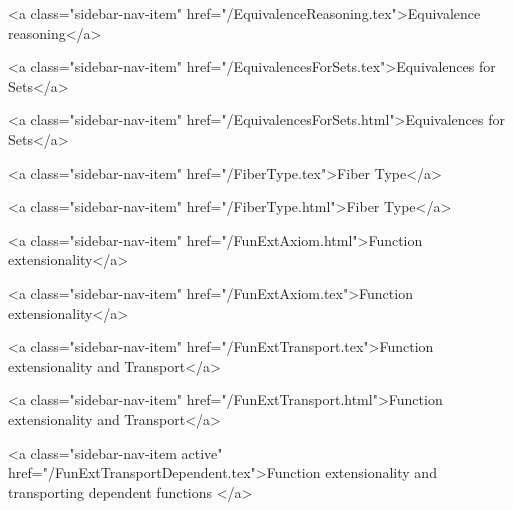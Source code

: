       
        
          <a class="sidebar-nav-item" href="/EquivalenceReasoning.tex">Equivalence reasoning</a>
        
      
    
      
        
          <a class="sidebar-nav-item" href="/EquivalencesForSets.tex">Equivalences for Sets</a>
        
      
    
      
        
          <a class="sidebar-nav-item" href="/EquivalencesForSets.html">Equivalences for Sets</a>
        
      
    
      
        
          <a class="sidebar-nav-item" href="/FiberType.tex">Fiber Type</a>
        
      
    
      
        
          <a class="sidebar-nav-item" href="/FiberType.html">Fiber Type</a>
        
      
    
      
        
          <a class="sidebar-nav-item" href="/FunExtAxiom.html">Function extensionality</a>
        
      
    
      
        
          <a class="sidebar-nav-item" href="/FunExtAxiom.tex">Function extensionality</a>
        
      
    
      
        
          <a class="sidebar-nav-item" href="/FunExtTransport.tex">Function extensionality and Transport</a>
        
      
    
      
        
          <a class="sidebar-nav-item" href="/FunExtTransport.html">Function extensionality and Transport</a>
        
      
    
      
        
          <a class="sidebar-nav-item active" href="/FunExtTransportDependent.tex">Function extensionality and transporting dependent functions </a>
        
      
    
      
        
